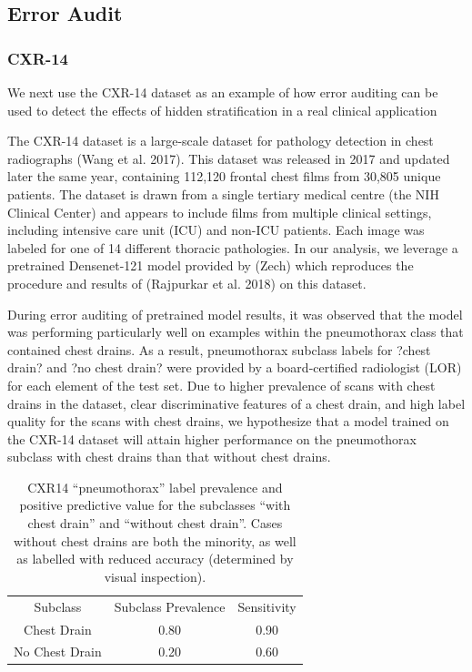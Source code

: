 \documentclass{article}
\begin{document}
\subsection{Error Audit}

\subsubsection{CXR-14}

We next use the CXR-14 dataset as an example of how error auditing can be used to detect the effects of hidden stratification in a real clinical application

The CXR-14 dataset is a large-scale dataset for pathology detection in chest radiographs (Wang et al. 2017). 
This dataset was released in 2017 and updated later the same year, containing 112,120 frontal chest films from 30,805 unique patients. 
The dataset is drawn from a single tertiary medical centre (the NIH Clinical Center) and appears to include films from multiple clinical settings, including intensive care unit (ICU) and non-ICU patients.  
Each image was labeled for one of 14 different thoracic pathologies.  
In our analysis, we leverage a pretrained Densenet-121 model provided by (Zech) which reproduces the procedure and results of (Rajpurkar et al. 2018) on this dataset.  

During error auditing of pretrained model results, it was observed that the model was performing particularly well on examples within the pneumothorax class that contained chest drains. 
 As a result, pneumothorax subclass labels for ?chest drain? and ?no chest drain? were provided by a board-certified radiologist (LOR) for each element of the test set.  
 Due to higher prevalence of scans with chest drains in the dataset, clear discriminative features of a chest drain, and high label quality for the scans with chest drains, we hypothesize that a model trained on the CXR-14 dataset will attain higher performance on the pneumothorax subclass with chest drains than that without chest drains.  
 
 \begin{table}[]
 \centering
\begin{tabular}{ccc}
 Subclass & Subclass Prevalence & Sensitivity \\
 Chest Drain & 0.80 & 0.90   \\
 No Chest Drain & 0.20 & 0.60    
\end{tabular}
\label{tab:mura1}
\caption{ CXR14 ``pneumothorax'' label prevalence and positive predictive value for the subclasses ``with chest drain'' and ``without chest drain''. Cases without chest drains are both the minority, as well as labelled with reduced accuracy (determined by visual inspection).}
\end{table}
\end{document}

